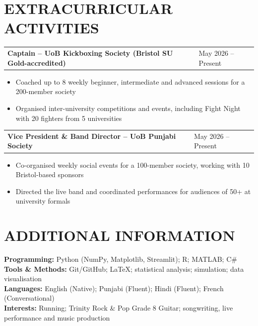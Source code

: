 \documentclass[9.5pt,a4paper]{article}
\makeatletter
\newcommand{\entry}[2]{%
  \vspace{2.5pt}%
  \begin{tabularx}{\textwidth}{@{}X>{\raggedleft\arraybackslash}p{3.45cm}@{}}
    \textbf{#1} & #2
  \end{tabularx}
}
\newcommand{\bulletitem}[1]{
  \item #1
}
\makeatother
\begin{document}
\section*{EXTRACURRICULAR ACTIVITIES}

\entry{Captain -- UoB Kickboxing Society (Bristol SU Gold-accredited)}{May 2026 -- Present}
\begin{itemize}
    \bulletitem{Coached up to 8 weekly beginner, intermediate and advanced sessions for a 200-member society}
    \bulletitem{Organised inter-university competitions and events, including Fight Night with 20 fighters from 5 universities}
\end{itemize}

\entry{Vice President \& Band Director -- UoB Punjabi Society}{May 2026 -- Present}
\begin{itemize}
    \bulletitem{Co-organised weekly social events for a 100-member society, working with 10 Bristol-based sponsors}
    \bulletitem{Directed the live band and coordinated performances for audiences of 50+ at university formals}
\end{itemize}

\section*{ADDITIONAL INFORMATION}

\textbf{Programming:} Python (NumPy, Matplotlib, Streamlit); R; MATLAB; C\#\\
\textbf{Tools \& Methods:} Git/GitHub; LaTeX; statistical analysis; simulation; data visualisation\\
\textbf{Languages:} English (Native); Punjabi (Fluent); Hindi (Fluent); French (Conversational)\\
\textbf{Interests:} Running; Trinity Rock \& Pop Grade 8 Guitar; songwriting, live performance and music production
\end{document}
